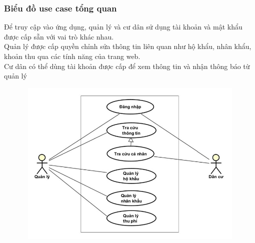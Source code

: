 \documentclass{article}
\begin{document}
\subsubsection{Biểu đồ use case tổng quan}
Để truy cập vào ứng dụng, quản lý và cư dân sử dụng tài khoản và mật khẩu được cấp sẵn với vai trò khác nhau. \\
Quản lý được cấp quyền chỉnh sửa thông tin liên quan như hộ khẩu, nhân khẩu, khoản thu qua các tính năng của trang web.\\
Cư dân có thể dùng tài khoản được cấp để xem thông tin và nhận thông báo từ quản lý
\begin{figure}[H]
    \centering
    \includegraphics[width=12.53cm, height = 8cm]{Ảnh chương 2/Tổng quát.jpg}
\end{figure}
\end{document}
